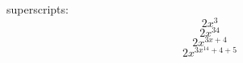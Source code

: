 \documentclass[11]{article}
\begin{document}
superscripts: 
$$ 2x^3 $$ %
$$ 2x^{34} $$ %
$$ 2x^{ 3x + 4} $$
$$ 2x^{ 3x^{14} + 4 + 5} $$ %
\end{document}
